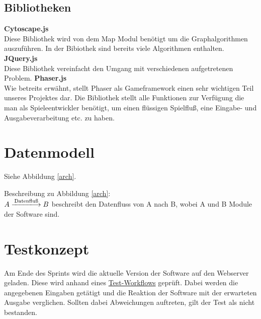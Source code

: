 \documentclass[11pt,a4paper]{article}
\begin{document}
\subsection{Bibliotheken}
{\flushleft \textbf{Cytoscape.js}} \\
Diese Bibliothek wird von dem Map Modul benötigt um die Graphalgorithmen auszuführen. In der Bibiothek sind bereits viele Algorithmen enthalten.
{\flushleft \textbf{JQuery.js}} \\
Diese Bibliothek vereinfacht den Umgang mit verschiedenen aufgetretenen Problem.
{\flushleft \textbf{Phaser.js}} \\
Wie betreits erwähnt, stellt Phaser als Gameframework einen sehr wichtigen Teil unseres Projektes dar. Die Bibliothek stellt alle Funktionen zur Verfügung die man als Spieleentwickler benötigt, um einen flüssigen Spielfluß, eine Eingabe- und Ausgabeverarbeitung etc. 
zu haben. 
\section{Datenmodell}

Siehe Abbildung \ref{arch}.\bigskip

Beschreibung zu Abbildung \ref{arch}: \\
$A \xlongrightarrow{\text{Datenfluß}} B $ beschreibt den Datenfluss von A nach B, wobei A und B Module der Software sind.


\section{Testkonzept}
Am Ende des Sprints wird die aktuelle Version der Software auf den Webserver geladen. Diese wird anhand eines \href{https://github.com/GKP15/pucman/wiki/Test-workflow}{Test-Workflows} geprüft. Dabei werden die angegebenen Eingaben getätigt und die Reaktion der Software mit der erwarteten Ausgabe verglichen. Sollten dabei Abweichungen auftreten, gilt der Test als nicht bestanden.
\end{document}
